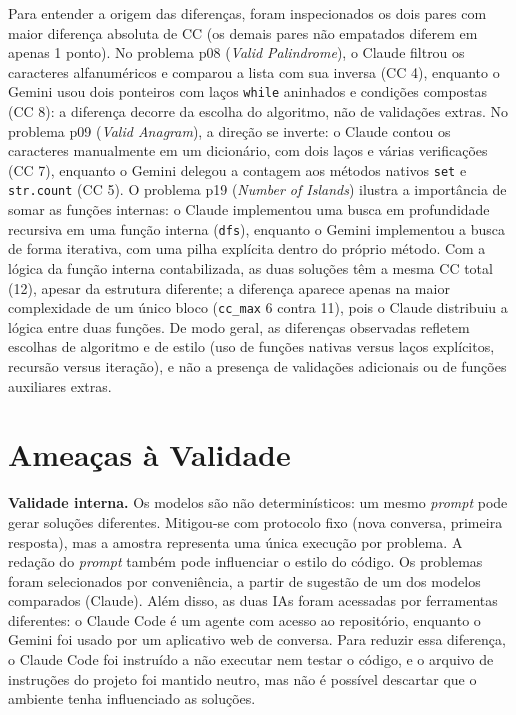 \documentclass[12pt]{article}
\begin{document}
Para entender a origem das diferenças, foram inspecionados os dois pares com maior diferença
absoluta de CC (os demais pares não empatados diferem em apenas 1 ponto). No problema p08 (\emph{Valid Palindrome}), o Claude filtrou os caracteres
alfanuméricos e comparou a lista com sua inversa (CC 4), enquanto o Gemini usou dois ponteiros
com laços \texttt{while} aninhados e condições compostas (CC 8): a diferença decorre da escolha
do algoritmo, não de validações extras. No problema p09 (\emph{Valid Anagram}), a direção se
inverte: o Claude contou os caracteres manualmente em um dicionário, com dois laços e várias
verificações (CC 7), enquanto o Gemini delegou a contagem aos métodos nativos \texttt{set} e
\texttt{str.count} (CC 5). O problema p19 (\emph{Number of Islands}) ilustra a importância de
somar as funções internas: o Claude implementou uma busca em profundidade recursiva em uma função
interna (\texttt{dfs}), enquanto o Gemini implementou a busca de forma iterativa, com uma pilha
explícita dentro do próprio método. Com a lógica da função interna contabilizada, as duas
soluções têm a mesma CC total (12), apesar da estrutura diferente; a diferença aparece apenas na
maior complexidade de um único bloco (\texttt{cc\_max} 6 contra 11), pois o Claude distribuiu a
lógica entre duas funções. De modo geral, as diferenças observadas refletem escolhas de algoritmo
e de estilo (uso de funções nativas versus laços explícitos, recursão versus iteração), e não a
presença de validações adicionais ou de funções auxiliares extras.

\section{Ameaças à Validade}
\label{sec:ameacas}
\textbf{Validade interna.} Os modelos são não determinísticos: um mesmo \emph{prompt} pode
gerar soluções diferentes. Mitigou-se com protocolo fixo (nova conversa, primeira resposta),
mas a amostra representa uma única execução por problema. A redação do \emph{prompt}
também pode influenciar o estilo do código. Os problemas foram selecionados por conveniência,
a partir de sugestão de um dos modelos comparados (Claude). Além disso, as duas IAs foram
acessadas por ferramentas diferentes: o Claude Code é um agente com acesso ao repositório,
enquanto o Gemini foi usado por um aplicativo web de conversa. Para reduzir essa diferença, o
Claude Code foi instruído a não executar nem testar o código, e o arquivo de instruções do
projeto foi mantido neutro, mas não é possível descartar que o ambiente tenha influenciado as
soluções.
\end{document}
